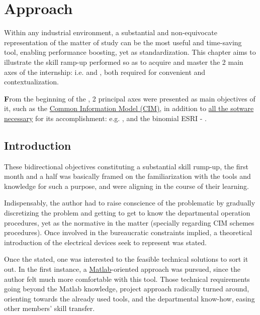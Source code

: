 \chapter[Approach]{Approach}
\label{cap:Approach}
\begin{Resumen}

Within any industrial environment, a substantial and non-equivocate representation of the matter of study can be the most useful and time-saving tool, enabling performance boosting, yet as standardization. This chapter aims to illustrate the skill ramp-up performed so as to acquire and master the 2 main axes of the internship: i.e.  and , both required for convenient  and contextualization.
\end{Resumen}
\PartialToc
\bigskip

\lettrine[lines=2]{\textbf{F}}{}rom the beginning of the , 2 principal axes were presented as main objectives of it, such as the \hyperref[sec:approach:cim]{Common Information Model (CIM)}, in addition to \hyperref[sec:approach:software]{all the sotware necessary} for its accomplishment: e.g. ,  and the binomial  ESRI - .

\section{Introduction}
\label{sec:Diagram:intro}

These bidirectional objectives constituting a substantial skill rump-up, the first month and a half was basically framed on the familiarization with the tools and knowledge for such a purpose, and were aligning in the course of their learning. 

Indispensably, the author had to raise conscience of the problematic by gradually discretizing the problem and getting to get to know the departmental operation procedures, yet as the normative in the matter (specially regarding CIM schemes procedures). Once involved in the bureaucratic constraints implied, a theoretical introduction of the electrical devices seek to represent was stated.

Once the  stated, one was interested to the feasible technical solutions to sort it out. In the first instance, a \hyperref[sec:approach:software:matlab]{Matlab}-oriented approach was pursued, since the author felt much more comfortable with this tool. Those technical requirements going beyond the Matlab knowledge, project approach radically turned around, orienting towards the already used tools, and the departmental know-how, easing other members' skill transfer. 

